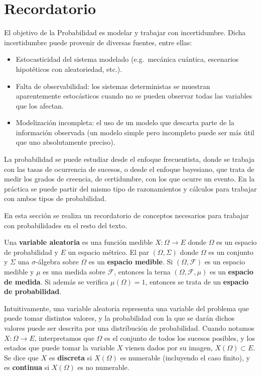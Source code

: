 \section{Recordatorio}\label{recordatorio}

El objetivo de la Probabilidad es modelar y trabajar con incertidumbre.
Dicha incertidumbre puede provenir de diversas fuentes, entre ellas:

\begin{itemize}
\tightlist
\item
  Estocasticidad del sistema modelado (e.g.~mecánica cuántica,
  escenarios hipotéticos con aleatoriedad, etc.).
\item
  Falta de observabilidad: los sistemas deterministas se muestran
  aparentemente estocásticos cuando no se pueden observar todas las
  variables que los afectan.
\item
  Modelización incompleta: el uso de un modelo que descarta parte de la
  información observada (un modelo simple pero incompleto puede ser más
  útil que uno absolutamente preciso).
\end{itemize}

La probabilidad se puede estudiar desde el enfoque frecuentista, donde
se trabaja con las tasas de ocurrencia de sucesos, o desde el enfoque
bayesiano, que trata de medir los grados de creencia, de certidumbre,
con los que ocurre un evento. En la práctica se puede partir del mismo
tipo de razonamientos y cálculos para trabajar con ambos tipos de
probabilidad.

En esta sección se realiza un recordatorio de conceptos necesarios para
trabajar con probabilidades en el resto del texto.

Una \textbf{variable aleatoria} es una función medible
\(X:\Omega\rightarrow E\) donde \(\Omega\) es un espacio de probabilidad
y \(E\) un espacio métrico. 
{}
El par \((\Omega, \Sigma)\) donde \(\Omega\) es un conjunto y \(\Sigma\)
una \(\sigma\)-álgebra sobre \(\Omega\) es un \textbf{espacio medible}.
{}
Si \((\Omega, \mathcal{F})\) es un espacio medible y \(\mu\) es una
medida sobre \(\mathcal{F}\), entonces la terna
\((\Omega, \mathcal{F}, \mu)\) es un \textbf{espacio de medida}. Si
además se verifica \(\mu(\Omega)=1\), entonces se trata de un
\textbf{espacio de probabilidad}. 

Intuitivamente, una variable aleatoria representa una variable del
problema que puede tomar distintos valores, y la probabilidad con la que
se darán dichos valores puede ser descrita por una distribución de
probabilidad. Cuando notamos \(X:\Omega\rightarrow E\), interpretamos
que \(\Omega\) es el conjunto de todos los sucesos posibles, y los
estados que puede tomar la variable \(X\) vienen dados por su imagen,
\(X(\Omega)\subset E\). Se dice que \(X\) es \textbf{discreta} si
\(X(\Omega)\) es numerable (incluyendo el caso finito), y es
\textbf{continua} si \(X(\Omega)\) es no numerable.

